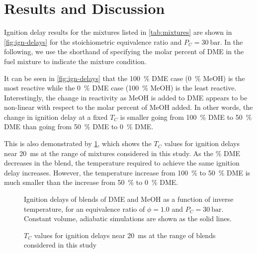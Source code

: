 \documentclass[12pt]{../ussci}
\begin{document}
\section{Results and Discussion}\label{sec:results-and-discussion}

Ignition delay results for the mixtures listed in \cref{tab:mixtures} are shown
in \cref{fig:ign-delays} for the stoichiometric equivalence ratio and \(P_C =
\SI{30}{\bar}\). In the following, we use the shorthand of specifying the molar
percent of DME in the fuel mixture to indicate the mixture condition.

It can be seen in \cref{fig:ign-delays} that the \SI{100}{\percent} DME case
(\SI{0}{\percent} MeOH) is the most reactive while the \SI{0}{\percent} DME case
(\SI{100}{\percent} MeOH) is the least reactive. Interestingly, the change in
reactivity as MeOH is added to DME appears to be non-linear with respect to the
molar percent of MeOH added. In other words, the change in ignition delay at a
fixed \(T_C\) is smaller going from \SI{100}{\percent} DME to \SI{50}{\percent}
DME than going from \SI{50}{\percent} DME to \SI{0}{\percent} DME.

This is also demonstrated by \cref{fig:temp-comp}, which shows the \(T_C\)
values for ignition delays near \SI{20}{\ms} at the range of mixtures considered
in this study. As the \si{\percent} DME decreases in the blend, the temperature
required to achieve the same ignition delay increases. However, the temperature
increase from \SI{100}{\percent} to \SI{50}{\percent} DME is much smaller than
the increase from \SI{50}{\percent} to \SI{0}{\percent} DME.

\begin{figure}[htb]
    \begin{minipage}[t]{0.48\textwidth}
        \centering
        \resizebox{\linewidth}{!}{}
        \caption{Ignition delays of blends of DME and MeOH as a function of
        inverse temperature, for an equivalence ratio of \(\phi = 1.0\) and
        \(P_C = \SI{30}{\bar}\). Constant volume, adiabatic simulations are
        shown as the solid lines.}
        \label{fig:ign-delays}
    \end{minipage}\hfill%
    \begin{minipage}[t]{0.48\textwidth}
        \centering
        \resizebox{\linewidth}{!}{}
        \caption{\(T_C\) values for ignition delays near \SI{20}{\ms} at the
        range of blends considered in this study}
        \label{fig:temp-comp}
    \end{minipage}\hfill%
\end{figure}
\end{document}
